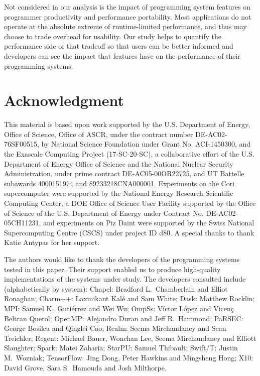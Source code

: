 
Not considered in our analysis is the impact of programming system
features on programmer productivity and performance portability. Most
applications do not operate at the absolute extreme of runtime-limited
performance, and thus may choose to trade overhead for
usability. Our study helps to quantify the performance side of that
tradeoff so that users can be better informed and developers can see
the impact that features have on the performance of their programming
systems.

\section*{Acknowledgment}

This material is based upon work supported by the U.S. Department of
Energy, Office of Science, Office of ASCR, under the contract number
DE-AC02-76SF00515, by National Science Foundation under Grant
No. ACI-1450300, and the Exascale Computing Project (17-SC-20-SC), a
collaborative effort of the U.S. Department of Energy Office of
Science and the National Nuclear Security Administration, under prime
contract DE-AC05-00OR22725, and UT Battelle subawards 4000151974 and
89233218CNA000001. Experiments on the Cori supercomputer were
supported by the National Energy Research Scientific Computing Center,
a DOE Office of Science User Facility supported by the Office of
Science of the U.S. Department of Energy under Contract
No. DE-AC02-05CH11231, and experiments on Piz Daint were supported by
the Swiss National Supercomputing Centre (CSCS) under project ID
d80. A special thanks to thank Katie Antypas for her support.

The authors would like to thank the developers of the programming
systems tested in this paper. Their support enabled us to produce
high-quality implementations of the systems under study. The
developers consulted include (alphabetically by system): Chapel:
Bradford L.~Chamberlain and Elliot Ronaghan; Charm++: Laxmikant Kalé
and Sam White; Dask: Matthew Rocklin; MPI: Samuel K.~Gutiérrez and Wei
Wu; OmpSs: Víctor López and Vicenç Beltran Querol; OpenMP: Alejandro
Duran and Jeff R.~Hammond; PaRSEC: George Bosilca and Qinglei Cao;
Realm: Seema Mirchandaney and Sean Treichler; Regent: Michael Bauer,
Wonchan Lee, Seema Mirchandaney and Elliott Slaughter; Spark: Matei
Zaharia; StarPU: Samuel Thibault; Swift/T: Justin M.~Wozniak;
TensorFlow: Jing Dong, Peter Hawkins and Mingsheng Hong; X10: David
Grove, Sara S.~Hamouda and Josh Milthorpe.
